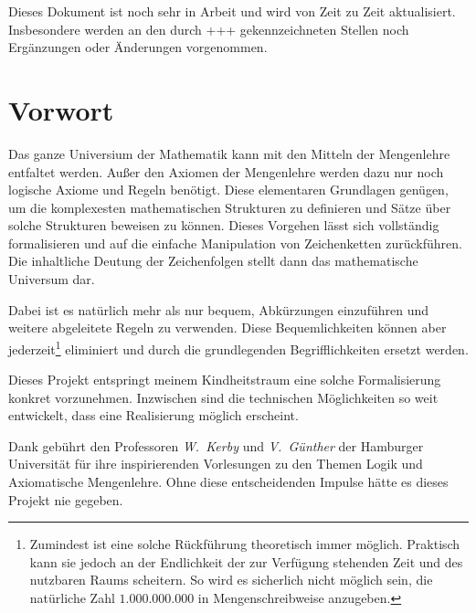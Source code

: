 \documentclass[a4paper,german,10pt,twoside]{book}
\theoremstyle{definition}
\theoremstyle{remark}
\begin{document}
\par
Dieses Dokument ist noch sehr in Arbeit und wird von Zeit zu Zeit aktualisiert. Insbesondere werden an den durch {\glqq+++\grqq} gekennzeichneten Stellen noch Erg{\"a}nzungen oder {\"A}nderungen vorgenommen.


\chapter*{Vorwort} \label{chapter1} \hypertarget{chapter1}{}

Das ganze Universium der Mathematik kann mit den Mitteln der Mengenlehre entfaltet werden. Au{\ss}er den Axiomen der Mengenlehre werden dazu nur noch logische Axiome und Regeln ben{\"o}tigt. Diese elementaren Grundlagen gen{\"u}gen, um die komplexesten mathematischen Strukturen zu definieren und S{\"a}tze {\"u}ber solche Strukturen beweisen zu k{\"o}nnen. Dieses Vorgehen l{\"a}sst 
sich vollst{\"a}ndig formalisieren und auf die einfache Manipulation von Zeichenketten zur{\"u}ckf{\"u}hren. Die inhaltliche Deutung der Zeichenfolgen stellt dann das mathematische Universum dar.

\par
Dabei ist es nat{\"u}rlich mehr als nur bequem, Abk{\"u}rzungen einzuf{\"u}hren und weitere abgeleitete Regeln zu verwenden. Diese Bequemlichkeiten k{\"o}nnen aber jederzeit\footnote{Zumindest ist eine solche R{\"u}ckf{\"u}hrung theoretisch immer m{\"o}glich. Praktisch kann sie jedoch an der Endlichkeit der zur Verf{\"u}gung stehenden Zeit und des nutzbaren Raums scheitern. So wird es 
sicherlich nicht m{\"o}glich sein, die nat{\"u}rliche Zahl $1.000.000.000$ in Mengenschreibweise anzugeben.} eliminiert und durch die grundlegenden Begrifflichkeiten ersetzt werden.

\par
Dieses Projekt entspringt meinem Kindheitstraum eine solche Formalisierung konkret vorzunehmen. Inzwischen sind die technischen M{\"o}glichkeiten so weit entwickelt, dass eine Realisierung m{\"o}glich erscheint.

\par
Dank geb{\"u}hrt den Professoren \emph{W.~Kerby} und \emph{V.~G{\"u}nther} der Hamburger Universit{\"a}t f{\"u}r ihre inspirierenden Vorlesungen zu den Themen Logik und Axiomatische Mengenlehre. Ohne diese entscheidenden Impulse h{\"a}tte es dieses Projekt nie gegeben.
\end{document}
